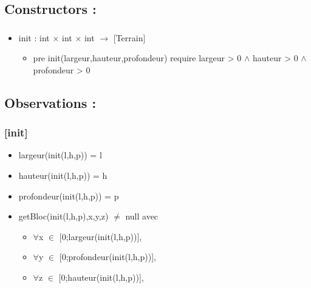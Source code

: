 \documentclass[11pt]{article}
\begin{document}
\subsection{Constructors :}
\label{sec-1.5}

\subsubsection{}

\begin{itemize}

\item init : int $\times$ int $\times$ int $\to$ [Terrain]\\
\label{sec-1.5.1.1}

\begin{itemize}

\item pre init(largeur,hauteur,profondeur) require largeur > 0 $\wedge$ hauteur > 0 $\wedge$ profondeur > 0\\
\label{sec-1.5.1.1.1}


\end{itemize} %
\end{itemize} %
\subsection{Observations :}
\label{sec-1.6}


\subsubsection{[init]}
\label{sec-1.6.1}

\begin{itemize}

\item largeur(init(l,h,p)) = l\\
\label{sec-1.6.1.1}


\item hauteur(init(l,h,p)) = h\\
\label{sec-1.6.1.2}


\item profondeur(init(l,h,p)) = p\\
\label{sec-1.6.1.3}


\item getBloc(init(l,h,p),x,y,z) $\neq$ null avec\\
\label{sec-1.6.1.4}

\begin{itemize}

\item $\forall$x $\in$ [0;largeur(init(l,h,p))],\\
\label{sec-1.6.1.4.1}


\item $\forall$y $\in$ [0;profondeur(init(l,h,p))],\\
\label{sec-1.6.1.4.2}


\item $\forall$z $\in$ [0;hauteur(init(l,h,p))],\\
\label{sec-1.6.1.4.3}

\end{itemize} %
\end{itemize} %
\end{document}
